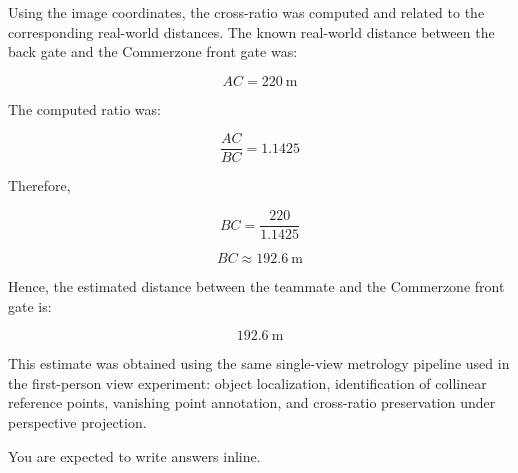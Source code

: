 \begin{enumerate}
\begin{studentSpace}
Using the image coordinates, the cross-ratio was computed and related to the corresponding real-world distances. The known real-world distance between the back gate and the Commerzone front gate was:

\[
AC = 220\ \text{m}
\]

The computed ratio was:

\[
\frac{AC}{BC} = 1.1425
\]

Therefore,

\[
BC = \frac{220}{1.1425}
\]

\[
BC \approx 192.6\ \text{m}
\]

Hence, the estimated distance between the teammate and the Commerzone front gate is:

\[
\boxed{192.6\ \text{m}}
\]

This estimate was obtained using the same single-view metrology pipeline used in the first-person view experiment: object localization, identification of collinear reference points, vanishing point annotation, and cross-ratio preservation under perspective projection.

\end{studentSpace}
\end{enumerate}

You are expected to write answers inline.


